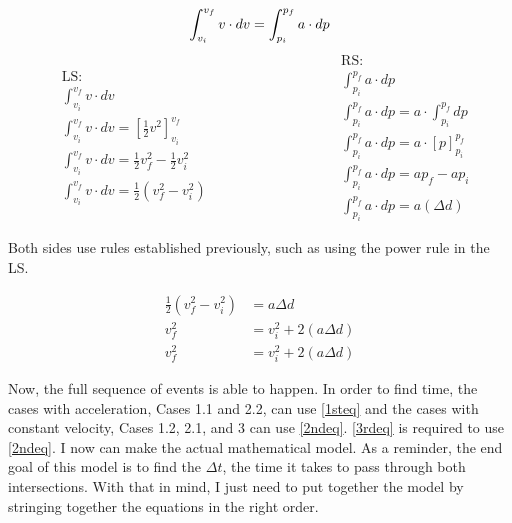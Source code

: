 \documentclass[11pt]{article}
\begin{document}
\begin{equation*}
    \int_{{v_i}}^{{v_f}} {v} \cdot d{v} = \int_{p_i}^{p_f} a \cdot dp \\
\end{equation*} %
\begin{equation*}
\begin{aligned}
    &\text{LS:} \\
    &\int_{{v_i}}^{{v_f}} {v} \cdot d{v} \\
    &\int_{{v_i}}^{{v_f}} {v} \cdot d{v} = [\frac{1}{2}{v^2}]_{{v_i}}^{{v_f}} \\
    &\int_{{v_i}}^{{v_f}} {v} \cdot d{v} = \frac{1}{2}{v^2_f} - \frac{1}{2}{v^2_i} \\
    &\int_{{v_i}}^{{v_f}} {v} \cdot d{v} = \frac{1}{2}({v^2_f} - {v^2_i})
\end{aligned}
\qquad\qquad\qquad\qquad
\begin{aligned}
    &\text{RS:} \\
    &\int_{p_i}^{p_f} {a} \cdot dp \\
	&\int_{p_i}^{p_f} {a} \cdot dp = {a} \cdot \int_{p_i}^{p_f} dp \\
	&\int_{p_i}^{p_f} {a} \cdot dp = {a} \cdot [p]_{p_i}^{p_f} \\
	&\int_{p_i}^{p_f} {a} \cdot dp = {a}p_f - {a}p_i \\
	&\int_{p_i}^{p_f} {a} \cdot dp = {a}(\Delta d)
\end{aligned}
\end{equation*} %

Both sides use rules established previously, such as using the power rule in the LS.

\vspace{-0.75cm}

\begin{align*}
    \frac{1}{2}({v^2_f} - {v^2_i}) &= {a}\Delta d \\
    {v^2_f} &= {v^2_i} + 2({a}\Delta d) \\
    {v^2_f} &= {v^2_i} + 2({a}\Delta d) \tag{5} \label{3rdeq}
\end{align*} %

Now, the full sequence of events is able to happen. In order to find time, the cases with acceleration, Cases 1.1 and 2.2, can use \eqref{1steq} and the cases with constant velocity, Cases 1.2, 2.1, and 3 can use \eqref{2ndeq}. \eqref{3rdeq} is required to use \eqref{2ndeq}. I now can make the actual mathematical model. As a reminder, the end goal of this model is to find the $\Delta t$, the time it takes to pass through both intersections. With that in mind, I just need to put together the model by stringing together the equations in the right order.
\end{document}
